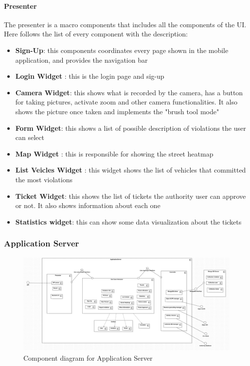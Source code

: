 \paragraph{Presenter}
The presenter is a macro components that includes all the components of the UI.
Here follows the list of every component with the description:
\begin{itemize}
  \item \textbf{Sign-Up}: this components coordinates every page shown in the mobile application, and provides the navigation bar
  \item \textbf{Login Widget} : this is the login page and sig-up
  \item \textbf{Camera Widget}: this shows what is recorded by the camera, has a button for taking pictures, activate zoom and other camera functionalities. It also shows the picture once taken and implements the "brush tool mode"
  \item \textbf{Form Widget}: this shows a list of possible description of violations the user can select
  \item \textbf{Map Widget} : this is responsible for showing the street heatmap
  \item \textbf{List Veicles Widget} : this widget shows the list of vehicles that committed the most violations
  \item \textbf{Ticket Widget}: this shows the list of tickets the authority user can approve or not. It also shows information about each one
  \item \textbf{Statistics widget}: this can show some data visualization about the tickets
\end{itemize}



\subsubsection{Application Server} \label{API}
\begin{figure}
\centering
\includegraphics[width=\textwidth]{Images/ComponentDiagram2.png}
\caption{\label{fig:compdiag2} Component diagram for Application Server}
\end{figure}

